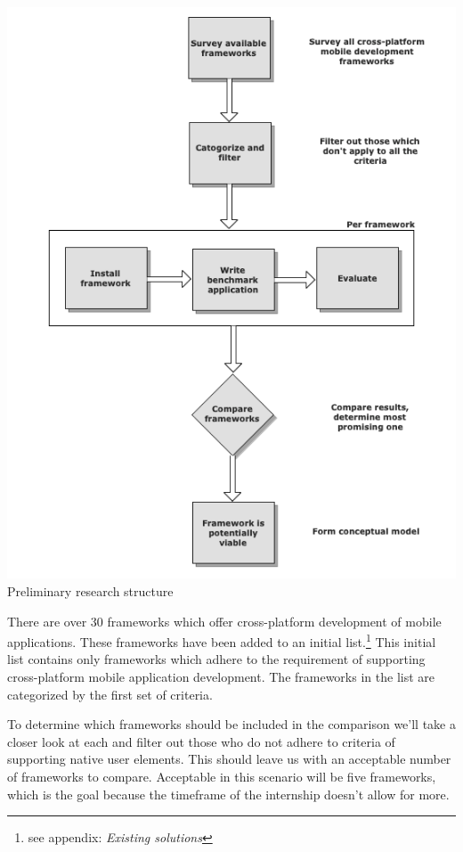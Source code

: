 \begin{centering}
\includegraphics[scale=0.6]{images/preliminary}\\{Preliminary research structure}\\
\end{centering}

There are over 30 frameworks which offer cross-platform development of mobile applications\cite{Wikipedia2012}. These frameworks have been added to an initial list.\footnote{see appendix: \emph{Existing solutions}} This initial list contains only frameworks which adhere to the requirement of supporting cross-platform mobile application development. The frameworks in the list are categorized by the first set of criteria.

To determine which frameworks should be included in the comparison we'll take a closer look at each and filter out those who do not adhere to criteria of supporting native user elements. This should leave us with an acceptable number of frameworks to compare. Acceptable in this scenario will be five frameworks, which is the goal because the timeframe of the internship doesn't allow for more.


